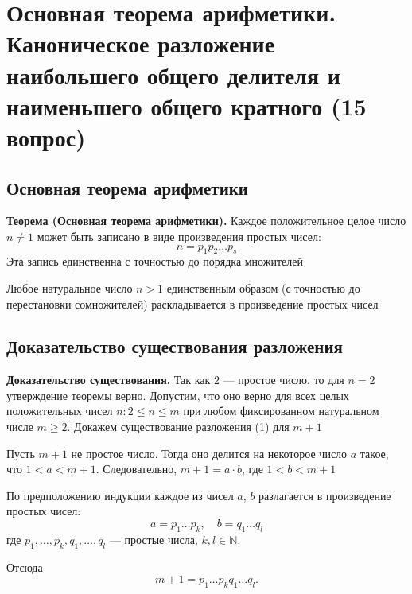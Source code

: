 \documentclass[a4paper,12pt]{article}
\theoremstyle{definition}
\theoremstyle{plain}
\theoremstyle{remark}
\begin{document}
	
	
	
	
	
	
	
	
	
	\newpage
	\section{Основная теорема арифметики. Каноническое разложение наибольшего общего делителя и наименьшего общего кратного (15 вопрос)}
	
	\subsection{Основная теорема арифметики}
	
	\noindent \textbf{Теорема (Основная теорема арифметики).}
	Каждое положительное целое число $n \neq 1$ может быть записано в виде произведения простых чисел:
	\[
	n = p_1 p_2 \dots p_s \tag{1}
	\]
	Эта запись единственна с точностью до порядка множителей
	
	\begin{tcolorbox}[colback=red!5, colframe=red!70!black, title=Формулировка]
	Любое натуральное число $n > 1$ единственным образом (с точностью до перестановки сомножителей) раскладывается в произведение простых чисел
	\end{tcolorbox}
	
	\subsection{Доказательство существования разложения}
	
	\noindent \textbf{Доказательство существования.}
	Так как $2$ — простое число, то для $n = 2$ утверждение теоремы верно. Допустим, что оно верно для всех целых положительных чисел $n \colon 2 \leq n \leq m$ при любом фиксированном натуральном числе $m \geq 2$. Докажем существование разложения (1) для $m + 1$
	
	Пусть $m + 1$ не простое число. Тогда оно делится на некоторое число $a$ такое, что $1 < a < m + 1$. Следовательно, $m + 1 = a \cdot b$, где $1 < b < m + 1$
	
	По предположению индукции каждое из чисел $a$, $b$ разлагается в произведение простых чисел:
	\[
	a = p_1 \dots p_k, \quad b = q_1 \dots q_l
	\]
	где $p_1, \dots, p_k, q_1, \dots, q_l$ — простые числа, $k, l \in \mathbb{N}$.
	
	Отсюда
	\[
	m + 1 = p_1 \dots p_k q_1 \dots q_l.
	\]
	
\end{document}
